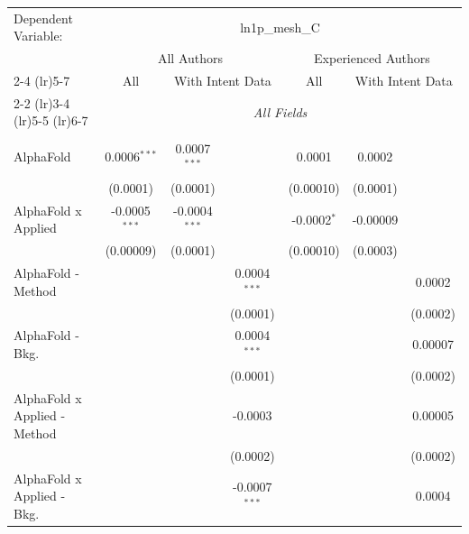 \begingroup
\centering
\begin{tabular}{lcccccc}
   \tabularnewline \midrule \midrule
   Dependent Variable: & \multicolumn{6}{c}{ln1p\_mesh\_C}\\
 & \multicolumn{3}{c}{All Authors} & \multicolumn{3}{c}{Experienced Authors} \\
\cmidrule(lr){2-4} \cmidrule(lr){5-7}
 & \multicolumn{1}{c}{All} & \multicolumn{2}{c}{With Intent Data} & \multicolumn{1}{c}{All} & \multicolumn{2}{c}{With Intent Data} \\
\cmidrule(lr){2-2} \cmidrule(lr){3-4} \cmidrule(lr){5-5} \cmidrule(lr){6-7}
 & \multicolumn{6}{c}{\textit{All Fields}} \\ \\
   AlphaFold                      & 0.0006$^{***}$  & 0.0007$^{***}$  &                 & 0.0001        & 0.0002       &   \\   
                                  & (0.0001)        & (0.0001)        &                 & (0.00010)     & (0.0001)     &   \\   
   AlphaFold x Applied            & -0.0005$^{***}$ & -0.0004$^{***}$ &                 & -0.0002$^{*}$ & -0.00009     &   \\   
                                  & (0.00009)       & (0.0001)        &                 & (0.00010)     & (0.0003)     &   \\   
   AlphaFold - Method             &                 &                 & 0.0004$^{***}$  &               &              & 0.0002\\   
                                  &                 &                 & (0.0001)        &               &              & (0.0002)\\   
   AlphaFold - Bkg.               &                 &                 & 0.0004$^{***}$  &               &              & 0.00007\\   
                                  &                 &                 & (0.0001)        &               &              & (0.0002)\\   
   AlphaFold x Applied - Method   &                 &                 & -0.0003         &               &              & 0.00005\\   
                                  &                 &                 & (0.0002)        &               &              & (0.0002)\\   
   AlphaFold x Applied - Bkg.     &                 &                 & -0.0007$^{***}$ &               &              & 0.0004\\   

\end{tabular}
